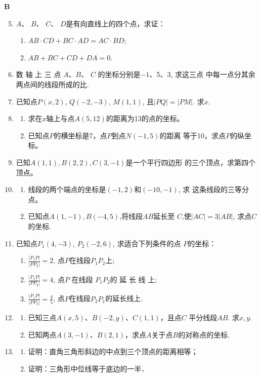 \begin{center}
    \bfseries B
\end{center}

\begin{enumerate}\setcounter{enumi}{4}
    \item $A$、 $B$、 $C$、 $D$是有向直线上的四个点，求证：
\begin{enumerate}[(1)]
    \item $AB\cdot CD+ BC\cdot AD= AC\cdot BD;$
    \item $AB+ BC+ CD+ DA= 0.$
\end{enumerate}
    \item 数 轴 上 三 点 $A$、$B$、 $C$ 的坐标分别是$-1$、5、3, 求这三点
    中每一点分其余两点间的线段所成的比.
    \item 已知点$P(x,2)$, $Q(-2,-3)$, $M(1,1)$, 且$|PQ|=|PM|$.
    求$x$.
    \item \begin{enumerate}[(1)]
        \item 求在$x$轴上与点$A(5,12)$的距离为13的点的坐标。
        \item 已知点$P$的横坐标是7，点$P$到点$N(-1,5)$的距离
    等于10，求点$P$的纵坐标。
    \end{enumerate}
    
    \item 已知$A(1,1),B(2,2),C(3,-1)$是一个平行四边形
    的三个顶点，求第四个顶点。
    \item \begin{enumerate}[(1)]
        \item 线段的两个端点的坐标是$(-1,2)$和$(-10,-1)$, 求
    这条线段的三等分点。
    \item 已知点$A(1,-1),B(-4,5)$,将线段$AB$延长至
    $C$,使$|AC|=3|AB|$, 求点$C$的坐标.
    \end{enumerate}
    \item 已知点$P_1(4,-3)$, $P_2(-2,6)$, 求适合下列条件的点
    $P$的坐标：
    \begin{enumerate}[(1)]
        \item $\frac {| P_{1}P| }{| PP_2 | }= 2$, 点$P$在线段$P_1P_2$上;
        \item $\frac {| P_{1}P| }{| PP_{2}| }= 4$, 点$P$ 在线段 $P_{1}P_{2}$的 延 长 线 上;
        \item $\frac {| P_{1}P| }{| PP_{2}| }= \frac 45$, 点$P$在线段$P_2P_{1}$的延长线上.
    \end{enumerate}
\item \begin{enumerate}[(1)]
    \item 已知三点$A(x,5)$、$B(-2,y)$、$C(1,1)$，且点$C$
平分线段$AB$. 求$x,y$.
\item 已知两点$A(3,-1)$、$B(2,1)$，求点$A$关于点$B$的对称点的坐标.
\end{enumerate} 
\item \begin{enumerate}[(1)]
    \item 证明：直角三角形斜边的中点到三个顶点的距离相等；
    \item 证明：三角形中位线等于底边的一半．
\end{enumerate}
\end{enumerate}

